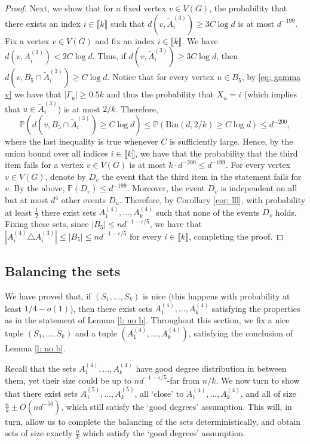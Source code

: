 \documentclass[notitlepage]{scrartcl}
\newcommand{\br}[1]{\llbracket{#1}\rrbracket}
\renewcommand{\Pr}{\mathbb{P}}
\begin{document}
\begin{proof}
    Next, we show that for a fixed vertex $v \in V(G)$, the probability that there exists an index $i \in \br{k}$ such that $d(v, \tilde{A}_i^{(3)}) \ge 3C \log d$ is at most $d^{-199}$. Fix a vertex $v \in V(G)$ and fix an index $i \in \br{k}$. We have $d(v, A_i^{(3)}) < 2C \log d$. Thus, if $d(v, \tilde{A}_i^{(3)}) \ge 3C \log d$, then $d(v,B_5\cap \tilde{A}_i^{(3)})\ge C\log d$. Notice that for every vertex $u \in B_5$, by \eqref{eq: gamma v} we have that $|\Gamma_u| \ge 0.5 k$ and thus the probability that $X_u = i$ (which implies that $u \in \tilde{A}_i^{(3)}$) is at most $2/k$. Therefore,
    \[
        \Pr\left(d(v, B_5 \cap \tilde{A}_i^{(3)}) \ge C \log d\right) \le \Pr\left(\text{Bin}\left(d, 2/k\right) \ge C \log d\right) \le d^{-200},
    \]
    where the last inequality is true whenever $C$ is sufficiently large. Hence, by the union bound over all indices $i \in \br{k}$, we have that the probability that the third item fails for a vertex $v \in V(G)$ is at most $k \cdot d^{-200} \le d^{-199}$.
    For every vertex $v \in V(G)$, denote by $D_v$ the event that the third item in the statement fails for $v$. By the above, $\Pr(D_v) \le d^{-199}$. Moreover, the event $D_v$ is independent on all but at most $d^4$ other events $D_u$. Therefore, by Corollary \ref{cor: lll}, with probability at least $\frac{1}{2}$ there exist sets $A_1^{(4)},\ldots, A_k^{(4)}$ such that none of the events $D_v$ holds. Fixing these sets, since $|B_5|\le nd^{-1-\epsilon/5}$, we have that $|A_i^{(4)}\triangle A_i^{(3)}|\le |B_5|\le nd^{-1-\epsilon/5}$ for every $i\in \br{k}$, completing the proof. 
\end{proof}

\subsection{Balancing the sets}\label{s: equal size} 

We have proved that, if $(S_1,\ldots,S_k)$ is nice (this happens with probability at least $1/4-o(1)$), then there exist sets $A_1^{(4)},\ldots, A_k^{(4)}$ satisfying the properties as in the statement of Lemma \ref{l: no b}.
Throughout this section, we fix a nice tuple $(S_1,\ldots,S_k)$ and a tuple $(A_1^{(4)},\ldots,A_k^{(4)})$, satisfying the conclusion of Lemma \ref{l: no b}.


Recall that the sets $A_1^{(4)},\ldots, A_k^{(4)}$ have good degree distribution in between them, yet their size could be up to $nd^{-1-\epsilon/5}$-far from $n/k$. We now turn to show that there exist sets $A_1^{(5)},\ldots, A_k^{(5)}$, all `close' to $A_1^{(4)},\ldots, A_k^{(4)}$, and all of size $\frac{n}{k}\pm O(nd^{-50})$, which still satisfy the `good degrees' assumption. This will, in turn, allow us to complete the balancing of the sets deterministically, and obtain sets of size exactly $\frac{n}{k}$ which satisfy the `good degrees' assumption. 
\end{document}
